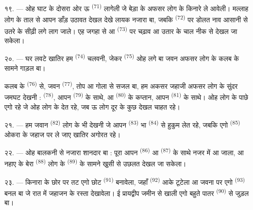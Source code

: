 १९. --- ओह घाट के दोसरा ओर ऊ  \textsuperscript{(71)}
लागेली जे बेड़ा के अफसर लोग के किनारे ले आवेली। मल्लाह लोग के ताल से
आपन डाँड़ उठावत देखल देखे लायक नजारा बा, जबकि 
\textsuperscript{(72)} पर डोलत नाव आसानी से उतरे के सीढ़ी लगे लाग जाले।
एह जगहा से  आ 
\textsuperscript{(73)} पर चढ़ाव आ उतार के चाल नीक से देखल जा सकेला।

\VUsaut{3.0mm}
\VUsaut{3.0mm}

२०. --- घर लवटे खातिर हम  \textsuperscript{(74)}
चलवनी, जेकर  \textsuperscript{(75)} ओह  लगे बा
जवन अफसर लोग के कलब के सामने गाड़ल बा।

कलब के  \textsuperscript{(76)} से, जवन 
\textsuperscript{(77)}, तोप आ गोला से सजल बा, हम अकसर जहाजी अफसर लोग के
सुंदर जमघट देखनी :  \textsuperscript{(78)}, आपन
 \textsuperscript{(79)} के साथे,  आ  \textsuperscript{(80)} के कप्तान, आपन
 \textsuperscript{(81)} के साथे। ओह लोग के पाछे एगो
 रहे जे ओह लोग के  देत रहे, जब ऊ लोग दूर
के कुछ देखल चाहत रहे।

२१. --- हम जवान  \textsuperscript{(82)} लोग के भी
देखनी जे आपन  \textsuperscript{(83)} भा 
\textsuperscript{(84)} से हुकुम लेत रहे, जबकि एगो 
\textsuperscript{(85)} ओकरा के जहाज पर ले जाए खातिर अगोरत रहे।

२२. --- ओह बालकनी से नजारा शानदार बा : पूरा 
आपन  \textsuperscript{(86)} आ 
\textsuperscript{(87)} के साथे नजर में आ जाला, आ नहाए के बेरा
 \textsuperscript{(88)} लोग के 
\textsuperscript{(89)} के सामने खुसी से उछलत देखल जा सकेला।

२३. --- किनारा के छोर पर तट एगो छोट 
\textsuperscript{(91)} बनावेला, जहाँ  \textsuperscript{(92)}
आके टूटेला आ जवना पर एगो  \textsuperscript{(93)} बनल बा जे
रात में जहाजन के रस्ता देखावेला। ई प्रायद्वीप जमीन से खाली एगो बहुते
पातर  \textsuperscript{(90)} से जुड़ल बा।

\VUsaut{3.0mm}
\VUsaut{3.0mm}

